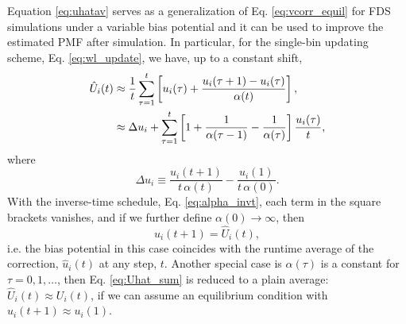 \documentclass[reprint, superscriptaddress, floatfix]{revtex4-1}
\begin{document}
Equation \eqref{eq:uhatav} serves as
a generalization of Eq. \eqref{eq:vcorr_equil}
for FDS simulations under a variable bias potential
and it can be used to improve the estimated PMF
after simulation.
%
In particular, for the single-bin updating scheme,
Eq. \eqref{eq:wl_update},
we have, up to a constant shift,
%
\begin{align}
  \hat U_i(t)
  &\approx
  \frac{1}{t} \sum_{\tau=1}^t
  \left[
    u_i(\tau) +
    \frac{ u_i(\tau + 1) - u_i(\tau) } { \alpha(t) }
  \right]
  ,
  \notag
  \\
  &\approx
  \Delta u_i
  +
  \sum_{\tau=1}^t
  \left[
    1 + \frac{1}{\alpha(\tau - 1)} - \frac{1}{\alpha(\tau)}
  \right]
  \frac{ u_i(\tau) } {t}
  ,
  \label{eq:Uhat_sum}
\end{align}
where
$$
\Delta u_i \equiv \frac{u_i(t+1)}{t \, \alpha(t)}
- \frac{u_i(1)}{t \, \alpha(0)}.
$$
%
With the inverse-time schedule, Eq. \eqref{eq:alpha_invt},
each term in the square brackets vanishes,
and if we further define $\alpha(0) \to \infty$,
then
$$
u_i(t+1) = \hat U_i(t),
$$
i.e. the bias potential in this case coincides with
the runtime average of the correction, $\hat u_i(t)$
at any step, $t$.
%
Another special case is $\alpha(\tau)$ is a constant for $\tau = 0, 1, \dots$,
then Eq. \eqref{eq:Uhat_sum} is reduced to a plain average\cite{zhou2005}:
$\hat U_i(t) \approx U_i(t)$,
if we can assume an equilibrium condition
with $u_i(t+1) \approx u_i(1)$.




%
\end{document}
